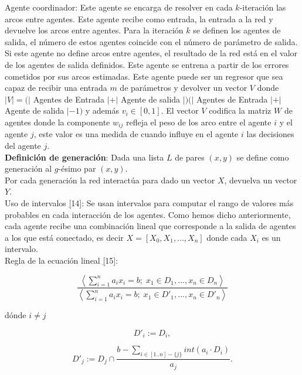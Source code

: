 \documentclass{article}
\begin{document}
        Agente coordinador: Este agente se encarga de resolver en cada $k$-iteración las arcos entre agentes. Este agente recibe como entrada, la entrada a la red y devuelve los arcos entre agentes. Para la iteración $k$ se definen los agentes de salida, el número de estos agentes coincide con el número de parámetro de salida. Si este agente no define arcos entre agentes, el resultado de la red está en el valor de los agentes de salida definidos. Este agente se entrena a partir de los errores cometidos por sus arcos estimadas. Este agente puede ser un regresor que sea capaz de recibir una entrada $m$ de parámetros y devolver un vector $V$ donde $|V|=(|$ Agentes de Entrada $| + |$ Agente de salida $|)(|$ Agentes de Entrada $| + |$ Agente de salida $| - 1)$ y además $v_i \in [0,1]$. El vector $V$ codifica la matriz $W$ de agentes donde la componente $w_{ij}$ refleja el peso de los arco entre el agente $i$ y el agente $j$, este valor es una medida de cuando influye en el agente $i$ las decisiones del agente $j$.\\

        \textbf{Definición de generación}: Dada una lista $L$ de pares $(x,y)$ se define como generación al $g$-ésimo par $(x,y)$. \\

        Por cada generación la red interactúa para dado un vector $X$, devuelva un vector $Y$.\\

        Uso de intervalos \hyperref[sec:24][14]: Se usan intervalos para computar el rango de valores más probables en cada interacción de los agentes. Como hemos dicho anteriormente, cada agente recibe una combinación lineal
        que corresponde a la salida de agentes a los que está conectado, es decir $X=[X_0,X_1,...,X_n]$ donde cada $X_i$ es un intervalo. \\

        Regla de la ecuación lineal \hyperref[sec:25][15]:

                $$\frac{\left\langle \sum_{i=1}^{n} a_i x_i = b ; \; x_1 \in D_1, \ldots, x_n \in D_n \right\rangle}
                {\left\langle \sum_{i=1}^{n} a_i x_i = b ; \; x_1 \in D'_1, \ldots, x_n \in D'_n \right\rangle}$$

            dónde $i \neq j$

            \[ D'_i := D_i, \]

            \[ D'_j := D_j \cap \frac{b - \sum_{i \in [1..n] - \{j\}} int(a_i \cdot D_i)}{a_j}. \]
\end{document}
